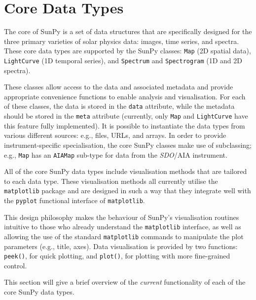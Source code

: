 \section{Core Data Types}\label{sec:DataTypes}

The core of SunPy is a set of data structures that are specifically designed for the
three primary varieties of solar physics data: images, time series, and
spectra. These core data types are supported by the SunPy classes:
\texttt{Map} (2D spatial data), \texttt{LightCurve} (1D temporal series),
and \texttt{Spectrum} and \texttt{Spectrogram} (1D and 2D spectra). 

These classes allow access to the data
and associated metadata and provide appropriate convenience functions to
enable analysis and visualisation. For each of these classes, the data is
stored in the \texttt{data} attribute, while the metadata should be stored 
in the \texttt{meta} attribute (currently, only \texttt{Map} and \texttt{LightCurve} have this feature 
fully implemented). 
It is possible to instantiate the
data types from various
different sources: e.g., files, URLs, and arrays.  
In order to provide instrument-specific specialisation, the core SunPy classes 
make use of subclassing; e.g., \texttt{Map} has an \texttt{AIAMap} 
sub-type for data from the \textit{SDO}/AIA instrument. 

All of the core SunPy data types 
include visualisation methods that are tailored to each data type. 
These visualisation methods all currently utilise the \texttt{matplotlib} 
package and are designed in such a way that they integrate well with 
the \texttt{pyplot} functional interface of \texttt{matplotlib}.

This design philosophy makes the behaviour of SunPy's visualisation 
routines intuitive to those who already understand the \texttt{matplotlib}
interface, as well as allowing the use of the standard 
\texttt{matplotlib} commands to manipulate the plot parameters (e.g., title, axes).
Data visualisation is provided by two functions: \texttt{peek()}, for quick 
plotting, and \texttt{plot()}, for plotting with more fine-grained control.

This section will give a brief overview of the \textit{current} functionality 
of each of the core SunPy data types.



